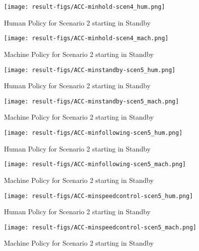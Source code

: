 \begin{figure}[h]
    \texttt{[image: result-figs/ACC-minhold-scen4\_hum.png]}
    \caption{Human Policy for Scenario 2 starting in Standby}
    \label{fig:hold-s4-hum}
\end{figure}

\begin{figure}[h]
    \texttt{[image: result-figs/ACC-minhold-scen4\_mach.png]}
    \caption{Machine Policy for Scenario 2 starting in Standby}
    \label{fig:hold-s4-mach}
\end{figure}

\begin{figure}[h]
    \texttt{[image: result-figs/ACC-minstandby-scen5\_hum.png]}
    \caption{Human Policy for Scenario 2 starting in Standby}
    \label{fig:standby-s5-hum}
\end{figure}

\begin{figure}[h]
    \texttt{[image: result-figs/ACC-minstandby-scen5\_mach.png]}
    \caption{Machine Policy for Scenario 2 starting in Standby}
    \label{fig:standby-s5-mach}
\end{figure}

\begin{figure}[h]
    \texttt{[image: result-figs/ACC-minfollowing-scen5\_hum.png]}
    \caption{Human Policy for Scenario 2 starting in Standby}
    \label{fig:following-s5-hum}
\end{figure}

\begin{figure}[h]
    \texttt{[image: result-figs/ACC-minfollowing-scen5\_mach.png]}
    \caption{Machine Policy for Scenario 2 starting in Standby}
    \label{fig:following-s5-mach}
\end{figure}

\begin{figure}[h]
    \texttt{[image: result-figs/ACC-minspeedcontrol-scen5\_hum.png]}
    \caption{Human Policy for Scenario 2 starting in Standby}
    \label{fig:speedcontrol-s5-hum}
\end{figure}

\begin{figure}[h]
    \texttt{[image: result-figs/ACC-minspeedcontrol-scen5\_mach.png]}
    \caption{Machine Policy for Scenario 2 starting in Standby}
    \label{fig:speedcontrol-s5-mach}
\end{figure}

